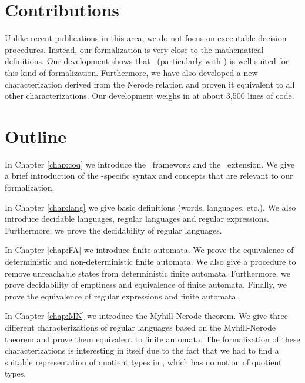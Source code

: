 \section{Contributions}
Unlike recent publications in this area, we do not focus on executable decision procedures.
Instead, our formalization is very close to the mathematical definitions.
Our development shows that \coq\ (particularly with \ssreflect) is well suited for this kind of formalization.
Furthermore, we have also developed a new characterization derived from the Nerode relation and proven it equivalent to all other characterizations.
Our development weighs in at about 3,500 lines of code.


\section{Outline}
In Chapter \ref{chap:coq} we introduce the \coq\ framework and the \ssreflect\ extension. 
We give a brief introduction of the \ssreflect-specific syntax and concepts that are relevant to our formalization.

In Chapter \ref{chap:lang} we give basic definitions (words, languages, etc.). 
We also introduce decidable languages, regular languages and regular expressions. 
Furthermore, we prove the decidability of regular languages.

In Chapter \ref{chap:FA} we introduce finite automata.
We prove the equivalence of deterministic and non-deterministic finite automata.
We also give a procedure to remove unreachable states from deterministic finite automata.
Furthermore, we prove decidability of emptiness and equivalence of finite automata.
Finally, we prove the equivalence of regular expressions and finite automata. 

In Chapter \ref{chap:MN} we introduce the Myhill-Nerode theorem.
We give three different characterizations of regular languages based on the Myhill-Nerode theorem and prove them equivalent to finite automata.
The formalization of these characterizations is interesting in itself due to the fact that we had to find a suitable representation of quotient types in \coq, which has no notion of quotient types.
